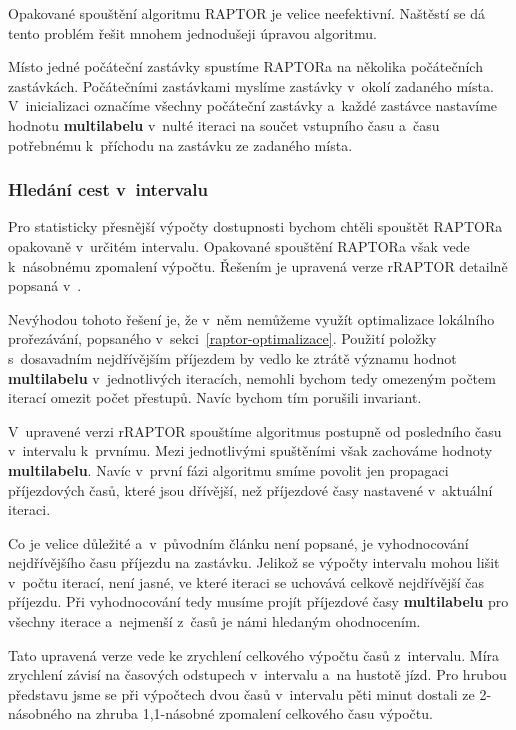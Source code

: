 Opakované spouštění algoritmu RAPTOR je velice neefektivní. Naštěstí se dá tento problém řešit mnohem jednodušeji úpravou algoritmu.

Místo jedné počáteční zastávky spustíme RAPTORa na několika počátečních zastávkách. Počátečními zastávkami myslíme zastávky v~okolí zadaného místa. V~inicializaci označíme všechny počáteční zastávky a~každé zastávce nastavíme hodnotu \textbf{multilabelu} v~nulté iteraci na součet vstupního času a~času potřebnému k~příchodu na zastávku ze zadaného místa.

\subsubsection{Hledání cest v~intervalu} \label{raptor-interval}

Pro statisticky přesnější výpočty dostupnosti bychom chtěli spouštět RAPTORa opakovaně v~určitém intervalu. Opakované spouštění RAPTORa však vede k~násobnému zpomalení výpočtu. Řešením je upravená verze rRAPTOR detailně popsaná v~\citet[Sekce 4.2]{raptor}.

Nevýhodou tohoto řešení je, že v~něm nemůžeme využít optimalizace lokálního prořezávání, popsaného v~sekci~\ref{raptor-optimalizace}. Použití položky s~dosavadním nejdřívějším příjezdem by vedlo ke ztrátě významu hodnot \textbf{multilabelu} v~jednotlivých iteracích, nemohli bychom tedy omezeným počtem iterací omezit počet přestupů. Navíc bychom tím porušili invariant.

V~upravené verzi rRAPTOR spouštíme algoritmus postupně od posledního času v~intervalu k~prvnímu. Mezi jednotlivými spuštěními však zachováme hodnoty \textbf{multilabelu}. Navíc v~první fázi algoritmu smíme povolit jen propagaci příjezdových časů, které jsou dřívější, než příjezdové časy nastavené v~aktuální iteraci.

Co je velice důležité a~v~původním článku není popsané, je vyhodnocování nejdřívějšího času příjezdu na zastávku. Jelikož se výpočty intervalu mohou lišit v~počtu iterací, není jasné, ve které iteraci se uchovává celkově nejdřívější čas příjezdu. Při vyhodnocování tedy musíme projít příjezdové časy \textbf{multilabelu} pro všechny iterace a~nejmenší z~časů je námi hledaným ohodnocením.

Tato upravená verze vede ke zrychlení celkového výpočtu časů z~intervalu. Míra zrychlení závisí na časových odstupech v~intervalu a~na hustotě jízd. Pro hrubou představu jsme se při výpočtech dvou časů v~intervalu pěti minut dostali ze 2-násobného na zhruba 1,1-násobné zpomalení celkového času výpočtu.


